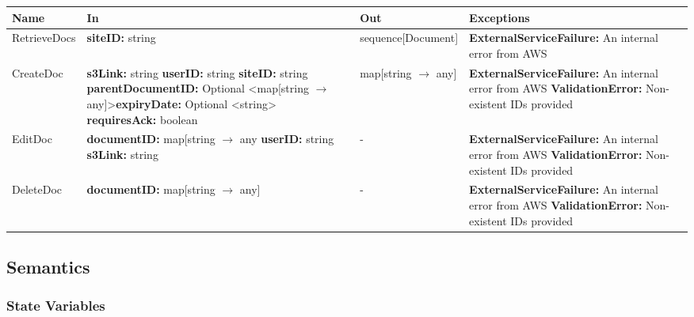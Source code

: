 \documentclass[12pt, titlepage]{article}
\begin{document}
\begin{center}
  \begin{tabular}{>{\raggedright}p{3cm} >{\raggedright}p{5cm}
    >{\raggedright}p{4cm} p{4cm}}
    \hline
    \textbf{Name} & \textbf{In} & \textbf{Out} & \textbf{Exceptions} \\
    \hline
    RetrieveDocs & \textbf{siteID:} string & sequence[Document] &
    \textbf{ExternalServiceFailure:} An internal error from AWS \\
    \hline
    CreateDoc & \textbf{s3Link:} string \newline \textbf{userID:}
    string \newline \textbf{siteID:} string \newline
    \textbf{parentDocumentID:} Optional \textless map[string
    $\rightarrow$ any]\textgreater \newline \textbf{expiryDate:}
    Optional \textless string\textgreater \newline
    \textbf{requiresAck:} boolean & map[string $\rightarrow$ any] &
    \textbf{ExternalServiceFailure:} An internal error from AWS \newline
    \textbf{ValidationError:} Non-existent IDs provided \\
    \hline
    EditDoc & \textbf{documentID:} map[string $\rightarrow$ any
      \newline \textbf{userID:} string \newline
      \textbf{s3Link:}
      string & - &
      \textbf{ExternalServiceFailure:} An internal error from AWS \newline
      \textbf{ValidationError:} Non-existent IDs provided \\
      \hline
      DeleteDoc & \textbf{documentID:} map[string $\rightarrow$ any] & - &
      \textbf{ExternalServiceFailure:} An internal error from AWS \newline
      \textbf{ValidationError:} Non-existent IDs provided \\
      \hline
    \end{tabular}
  \end{center}

  \subsection{Semantics}

  \subsubsection{State Variables}
\end{document}
